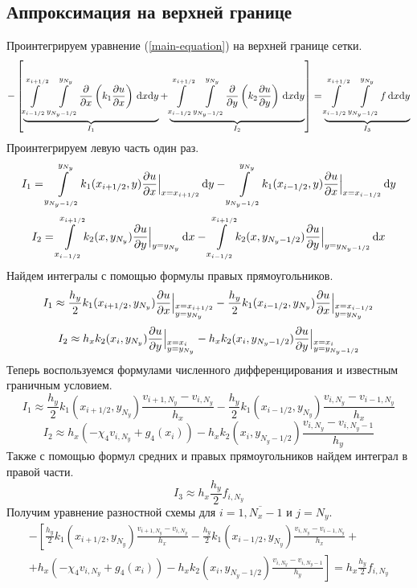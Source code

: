 \subsection{Аппроксимация на верхней границе}
Проинтегрируем уравнение (\ref{main-equation}) на верхней границе сетки.
\[
  - \left[
  \underbrace{ \int\limits_{x_{i-1/2}}^{x_{i+1/2}}\int\limits_{y_{N_y-1/2}}^{y_{N_y}} \! \pdv{x}\left( k_1 \pdv{u}{x} \right) \, \dd x \dd y }_{I_1} +
  \underbrace{ \int\limits_{x_{i-1/2}}^{x_{i+1/2}}\int\limits_{y_{N_y-1/2}}^{y_{N_y}} \! \pdv{y}\left( k_2 \pdv{u}{y} \right) \, \dd x \dd y }_{I_2}
  \right] =
  \underbrace{ \int\limits_{x_{i-1/2}}^{x_{i+1/2}}\int\limits_{y_{N_y-1/2}}^{y_{N_y}} \! f \, \dd x \dd y }_{I_3}
\]
Проинтегрируем левую часть один раз.
\[ I_1 = \int\limits_{y_{N_y-1/2}}^{y_{N_y}} \! k_1(x_{i+1/2},y) \pdv{u}{x} \Big\vert_{x = x_{i+1/2}} \, \dd y - \int\limits_{y_{N_y-1/2}}^{y_{N_y}} \! k_1(x_{i-1/2},y) \pdv{u}{x} \Big\vert_{x = x_{i-1/2}} \, \dd y \]
\[ I_2 = \int\limits_{x_{i-1/2}}^{x_{i+1/2}} \! k_2(x,y_{N_y}) \pdv{u}{y} \Big\vert_{y = y_{N_y}} \, \dd x - \int\limits_{x_{i-1/2}}^{x_{i+1/2}} \! k_2(x,y_{N_y-1/2}) \pdv{u}{y} \Big\vert_{y = y_{N_y-1/2}} \, \dd x \]
Найдем интегралы с помощью формулы правых прямоугольников.
\[ I_1 \approx \frac{h_y}{2} k_1(x_{i+1/2},y_{N_y}) \pdv{u}{x} \Big\vert_{\begin{subarray}{l} x = x_{i+1/2} \\ y = y_{N_y} \end{subarray}} - \frac{h_y}{2} k_1(x_{i-1/2},y_{N_y}) \pdv{u}{x} \Big\vert_{\begin{subarray}{l} x = x_{i-1/2} \\ y = y_{N_y} \end{subarray}} \]
\[ I_2 \approx h_x k_2(x_i,y_{N_y}) \pdv{u}{y} \Big\vert_{\begin{subarray}{l} x = x_{i} \\ y = y_{N_y} \end{subarray}} - h_x k_2(x_i,y_{N_y-1/2}) \pdv{u}{y} \Big\vert_{\begin{subarray}{l} x = x_{i} \\ y = y_{N_y-1/2} \end{subarray}} \]
Теперь воспользуемся формулами численного дифференцирования и известным граничным условием.
\[ I_1 \approx \frac{h_y}{2} k_1(x_{i+1/2},y_{N_y}) \frac{v_{i+1,N_y} - v_{i,N_y}}{h_x} - \frac{h_y}{2} k_1(x_{i-1/2},y_{N_y}) \frac{v_{i,N_y} - v_{i-1,N_y}}{h_x} \]
\[ I_2 \approx h_x \left( - \chi_4 v_{i,N_y} + g_4(x_i) \right) - h_x k_2(x_i,y_{N_y-1/2}) \frac{v_{i,N_y} - v_{i,N_y-1}}{h_y} \]
Также с помощью формул средних и правых прямоугольников найдем интеграл в правой части.
\[ I_3 \approx h_x \frac{h_y}{2} f_{i,N_y} \]
Получим уравнение разностной схемы для $i = \overline{1,N_x-1}$ и $j = N_y$.
\begin{multline*}
  - \left[
  \frac{h_y}{2} k_1(x_{i+1/2},y_{N_y}) \frac{v_{i+1,N_y} - v_{i,N_y}}{h_x} - \frac{h_y}{2} k_1(x_{i-1/2},y_{N_y}) \frac{v_{i,N_y} - v_{i-1,N_y}}{h_x} + \right. \\
  \left. +
  h_x \left( - \chi_4 v_{i,N_y} + g_4(x_i) \right) - h_x k_2(x_i,y_{N_y-1/2}) \frac{v_{i,N_y} - v_{i,N_y-1}}{h_y}
  \right] =
  h_x \frac{h_y}{2} f_{i,N_y}
\end{multline*}


